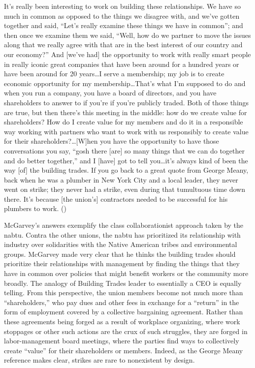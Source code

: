 \documentclass[12pt]{article}
\renewenvironment{quote}
  {\list{}{\leftmargin=\parindent\rightmargin=0pt}%
   \item\relax}
  {\endlist}
\begin{document}
\begin{quote}
It’s really been interesting to work on building these relationships. We have so much in common as opposed to the things we disagree with, and we've gotten together and said, “Let's really examine these things we have in common”; and then once we examine them we said, “Well, how do we partner to move the issues along that we really agree with that are in the best interest of our country and our economy?” And [we’ve had] the opportunity to work with really smart people in really iconic great companies that have been around for a hundred years or have been around for 20 years\ldots{}I serve a membership; my job is to create economic opportunity for my membership\ldots{}That's what I'm supposed to do and when you run a company, you have a board of directors, and you have shareholders to answer to if you're if you're publicly traded. Both of those things are true, but then there's this meeting in the middle: how do we create value for shareholders? How do I create value for my members and do it in a responsible way working with partners who want to work with us responsibly to create value for their shareholders?\ldots{}[W]hen you have the opportunity to have those conversations you say, “gosh there [are] so many things that we can do together and do better together,” and I [have] got to tell you\ldots{}it's always kind of been the way [of] the building trades. If you go back to a great quote from George Meany, back when he was a plumber in New York City and a local leader, they never went on strike; they never had a strike, even during that tumultuous time down there. It's because [the union’s] contractors needed to be successful for his plumbers to work. (\cite{natgasnowNextInfrastructureChallenge2015})
\end{quote}

McGarvey’s answers exemplify the class collaborationist approach taken by the \acrshort{nabtu}. Contra the other unions, the \acrshort{nabtu} has prioritized its relationship with industry over solidarities with the Native American tribes and environmental groups. McGarvey made very clear that he thinks the building trades should prioritize their relationships with management by finding the things that they have in common over policies that might benefit workers or the community more broadly. The analogy of Building Trades leader to essentially a CEO is equally telling. From this perspective, the union members become not much more than “shareholders,” who pay dues and other fees in exchange for a “return” in the form of employment covered by a collective bargaining agreement. Rather than these agreements being forged as a result of workplace organizing, where work stoppages or other such actions are the crux of such struggles, they are forged in labor-management board meetings, where the parties find ways to collectively create “value” for their shareholders or members. Indeed, as the George Meany reference makes clear, strikes are rare to nonexistent by design.
\end{document}
